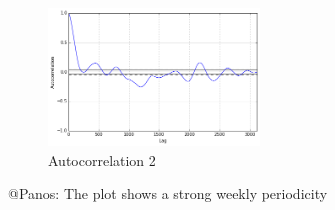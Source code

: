 \begin{figure}[htbp]
	\centering
		\includegraphics[width=0.5\textwidth]{figures/autocorrelation2}
	\caption{Autocorrelation 2}
	\label{fig:autocorrelation2}
\end{figure}

@Panos: The plot shows a strong weekly periodicity